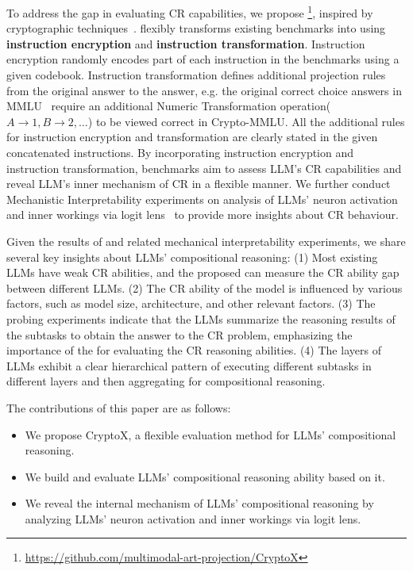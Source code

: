 To address the gap in evaluating CR capabilities, we propose \textbf{\ourmethod{}}\footnote{\url{https://github.com/multimodal-art-projection/CryptoX}}, inspired by cryptographic techniques~\citep{crypto}. 
\ourmethod{} flexibly transforms existing benchmarks into \benchmark{} using \textbf{instruction encryption} and \textbf{instruction transformation}.  
Instruction encryption randomly encodes part of each instruction in the benchmarks using a given codebook.
Instruction transformation defines additional projection rules from the original answer to the \ourmethod{} answer, e.g. the original correct choice answers in MMLU~\citep{MMLU} require an additional Numeric Transformation operation($A \rightarrow 1,B \rightarrow 2
 ,\dots $) to be viewed correct in Crypto-MMLU.
All the additional rules for instruction encryption and transformation are clearly stated in the given concatenated instructions.
By incorporating instruction encryption and instruction transformation, \benchmark{} benchmarks aim to assess LLM's CR capabilities and reveal LLM's inner mechanism of CR in a flexible manner.
We further conduct Mechanistic Interpretability experiments on analysis of LLMs' neuron activation and inner workings via logit lens~\citep{logitlens} to provide more insights about CR behaviour.

Given the results of \benchmark{} and related mechanical interpretability experiments, we share several key insights about LLMs' compositional reasoning: (1) Most existing LLMs have weak CR abilities, and the proposed \benchmark{} can measure the CR ability gap between different LLMs. (2) The CR ability of the model is influenced by various factors, such as model size, architecture, and other relevant factors.
(3) The probing experiments indicate that the LLMs summarize the reasoning results of the subtasks to obtain the answer to the CR problem, emphasizing the importance of the \benchmark{} for evaluating the CR reasoning abilities. (4) The layers of LLMs exhibit a clear hierarchical pattern of executing different subtasks in different layers and then aggregating for compositional reasoning. 

The contributions of this paper are as follows:
\vspace{-10pt}
\begin{itemize}
\item We propose CryptoX, a flexible evaluation method for LLMs' compositional reasoning.
\item We build \benchmark{} and evaluate LLMs' compositional reasoning ability based on it.
\item We reveal the internal mechanism of LLMs' compositional reasoning by analyzing LLMs' neuron activation and inner workings via logit lens.
\end{itemize}